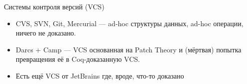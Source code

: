 \begin{frame}{Системы контроля версий (VCS)}
  \begin{itemize}
  \item CVS, SVN, Git, Mercurial — ad-hoc структуры данных, ad-hoc
    операции, ничего не доказано.
  \item Darcs + Camp — VCS основанная на Patch Theory и (мёртвая)
    попытка превращения её в Coq-доказанную VCS.
  \item Есть ещё VCS от JetBrains где, вроде, что-то доказано %
  \end{itemize}
\end{frame}
